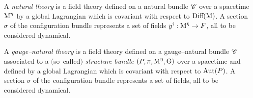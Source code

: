 \begin{defi}
    A \emph{natural theory} is a field theory defined on a natural bundle $\mathscr{C}$ over a spacetime $\text{\normalfont M}^\eta$ by a global Lagrangian which is covariant with respect to $\text{\normalfont Diff}(\text{\normalfont M})$. A section $\sigma$ of the configuration bundle represents a set of fields $y^i:\text{\normalfont M}^\eta\to F$, all to be considered dynamical.
\end{defi}

\begin{defi}
     A \emph{gauge--natural theory} is a field theory defined on a gauge--natural bundle $\mathscr{C}$ associated to a $($so--called$)$ \emph{structure bundle} $(P,\pi,\text{\normalfont M}^\eta,\text{\normalfont G})$ over a spacetime and defined by a global Lagrangian which is covariant with respect to $\text{\normalfont Aut}(P)$. A section $\sigma$ of the configuration bundle represents a set of fields, all to be considered dynamical.
\end{defi}
 




